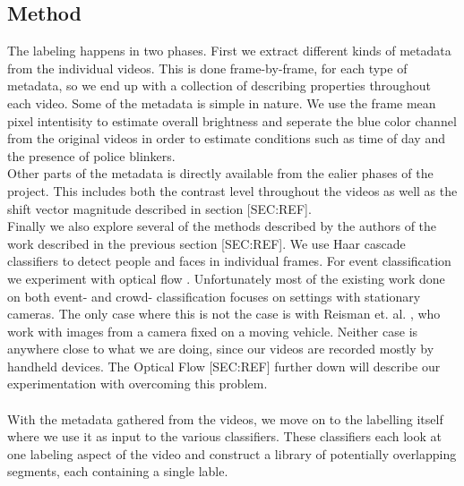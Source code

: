 \subsection{Method}
%
The labeling happens in two phases. First we extract different kinds of metadata from the individual videos. This is done frame-by-frame, for each type of metadata, so we end up with a collection of describing properties throughout each video. Some of the metadata is simple in nature. We use the frame mean pixel intentisity to estimate overall brightness and seperate the blue color channel from the original videos in order to estimate conditions such as time of day and the presence of police blinkers.\\
Other parts of the metadata is directly available from the ealier phases of the project. This includes both the contrast level throughout the videos as well as the shift vector magnitude described in section [SEC:REF].\\
Finally we also explore several of the methods described by the authors of the work described in the previous section [SEC:REF]. We use Haar cascade classifiers \cite{viola01}\cite{lienhart01}\cite{schmidt01}\cite{schmidt02} to detect people and faces in individual frames. For event classification we experiment with optical flow \cite{Bouguet2000}. Unfortunately most of the existing work done on both event- and crowd- classification focuses on settings with stationary cameras. The only case where this is not the case is with Reisman et. al. \cite{CrowdDetectionInVideoSequences}, who work with images from a camera fixed on a moving vehicle. Neither case is anywhere close to what we are doing, since our videos are recorded mostly by handheld devices. The Optical Flow [SEC:REF] further down will describe our experimentation with overcoming this problem.\\
\\
With the metadata gathered from the videos, we move on to the labelling itself where we use it as input to the various classifiers. These classifiers each look at one labeling aspect of the video and construct a library of potentially overlapping segments, each containing a single lable.\\

